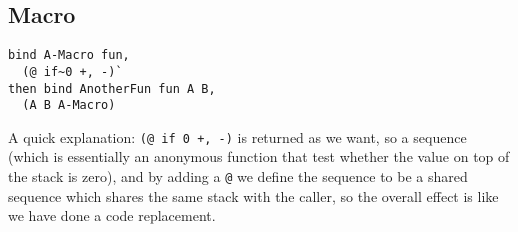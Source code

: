 \documentclass{book}
\begin{document}
\subsection{Macro}
\begin{verbatim}
bind A-Macro fun,
  (@ if~0 +, -)`
then bind AnotherFun fun A B,
  (A B A-Macro)
\end{verbatim}

A quick explanation: \texttt{(@ if~0 +, -)} is returned as we want, so a sequence (which is essentially an anonymous function that test whether the value on top of the stack is zero), and by adding a \texttt{@} we define the sequence to be a shared sequence which shares the same stack with the caller, so the overall effect is like we have done a code replacement.
\end{document}
